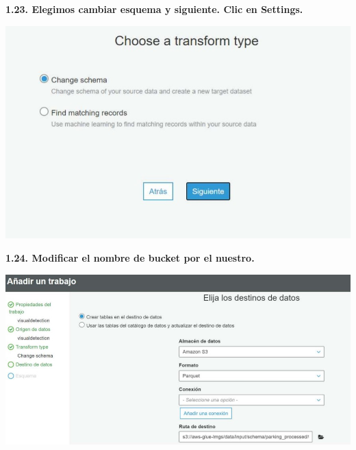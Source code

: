 \documentclass{article}
\begin{document}
	
		\textbf{1.23.  Elegimos cambiar esquema y siguiente.
Clic en Settings.
}

    \begin{center}
		\includegraphics[width=15cm]{./images/24} 
	\end{center}
	
	
		\textbf{1.24. Modificar el nombre de bucket por el nuestro.
}

    \begin{center}
		\includegraphics[width=15cm]{./images/25} 
	\end{center}
	
	
\end{document}
